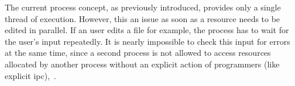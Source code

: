 
%
%
%
%
%

The current process concept, as previously introduced, provides only a single thread of execution.
However, this an issue as soon as a resource needs to be edited in parallel.
If an user edits a file for example, the process has to wait for the user's input repeatedly. 
It is nearly impossible to check this input for errors at the same time, since a second process is not allowed to access resources allocated by another process without an explicit action of programmers (like explicit \acl{ipc})\cite{tanenbaum-modern-operating-systems},~\cite{brause2017betriebssysteme}.

